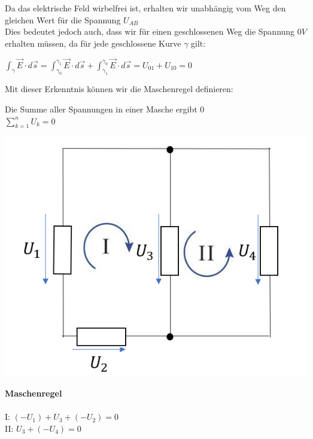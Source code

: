 					Da das elektrische Feld wirbelfrei ist, erhalten wir unabhängig vom Weg den gleichen Wert für die Spannung $ U_{AB} $ \\
					Dies bedeutet jedoch auch, dass wir für einen geschlossenen Weg die Spannung $0V$ erhalten müssen, da für jede geschlossene Kurve $\gamma$ gilt:
					\begin{center}
						\vspace{-2mm}

						$\displaystyle \int_{\gamma} \vec{E} \cdot d\vec{s} = \int_{\gamma_0}^{\gamma_1} \vec{E} \cdot d\vec{s} + \int_{\gamma_1}^{\gamma_0} \vec{E} \cdot d\vec{s} = U_{01} + U_{10} = 0$
					\end{center}
					Mit dieser Erkenntnis können wir die Maschenregel definieren:

					\beginip
					Die Summe aller Spannungen in einer Masche ergibt $0$ \\
					\formulaBegin
					$\displaystyle \sum_{k=1}^n U_k = 0$
					\formulaEnd

					\iend

					\begin{minipage}{0.6\textwidth}
						\begin{flushright}
						\includegraphics[scale=0.45]{img/maschenregel-2.png}
					\end{flushright}
					\end{minipage}
					\begin{minipage}{0.4\textwidth}
						\textbf{Maschenregel} \\ \\
						I: $\displaystyle (- U_1) + U_3 + (-U_2)  = 0$ \\
						II: $\displaystyle U_3 + (- U_4) = 0 $ \\
					\end{minipage}

